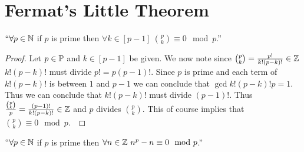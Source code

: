      \section{Fermat's Little Theorem}
        \begin{lemma}
            $``\forall p \in \mathbb{N}$ if $p$ is prime then 
            $\forall k \in [p - 1] \ \binom{p}{k} \equiv 0 \mod p$.''
            \label{prime binomials}
        \end{lemma}
        \begin{proof}
            Let $p \in \mathbb{P}$ and $k \in [p - 1]$ be given. We now note since
            $\binom{p}{k} = \frac{p!}{k!(p - k)!} \in \mathbb{Z}$ $k!(p - k)!$ 
            must divide $p! = p(p - 1)!$. Since $p$ is prime and each term
            of $k!(p - k)!$ is between $1$ and $p - 1$ we can conclude that
            $\gcd{k!(p - k)!}{p} = 1$. Thus we can conclude that $k!(p - k)!$
            must divide $(p - 1)!$. Thus $\frac{\binom{p}{k}}{p} = \frac{(p - 1)!}{k!(p - k)!}
            \in \mathbb{Z}$ and $p$ divides $\binom{p}{k}$. This of course implies that
            $\binom{p}{k} \equiv 0 \mod p$.~\QED
        \end{proof}
        \begin{lemma}
            $``\forall p \in \mathbb{N}$ if $p$ is prime then 
            $\forall n \in \mathbb{Z} \ n^p - n \equiv 0 \mod p$.''
            \label{fermat lemma}
        \end{lemma}
